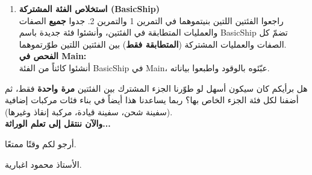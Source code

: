 \documentclass[14pt]{extarticle}
\begin{document}
\begin{enumerate}[label=\textbf{تمرين \arabic*:}, wide=0pt, leftmargin=*, itemsep=2.2em]
    \vspace{2em}
    \noindent \textbf{الفحص في \textenglish{Main}:} \\
    أنشئوا مركبة سبات، عبّئوها بالوقود، وجرّبوا سحب الوقود مرة بتاريخ يسبق تاريخ الوصول ومرة بتاريخ يساويه أو يتأخر عنه، واطبعوا النتائج.

    \item \textbf{استخلاص الفئة المشتركة (\textenglish{BasicShip})} \\
    راجعوا الفئتين اللتين بنيتموهما في التمرين 1 والتمرين 2. جدوا \textbf{جميع} الصفات والعمليات المتطابقة في الفئتين، وأنشئوا فئة جديدة باسم \textenglish{BasicShip} تضمّ كل الصفات والعمليات المشتركة (\textbf{المتطابقة فقط}) بين الفئتين اللتين طوّرتموهما. \\
    \textbf{الفحص في \textenglish{Main}:} \\
    أنشئوا كائناً من الفئة \textenglish{BasicShip} في \textenglish{Main}، عبّئوه بالوقود واطبعوا بياناته.

\end{enumerate}

\begin{boxAttention}
هل برأيكم كان سيكون أسهل لو طوّرنا الجزء المشترك بين الفئتين \textbf{مرة واحدة} فقط، ثم أضفنا لكل فئة الجزء الخاص بها؟ ربما يساعدنا هذا أيضاً في بناء فئات مركبات إضافية (سفينة شحن، سفينة قيادة، مركبة إنقاذ وغيرها). \\
\textbf{والآن ننتقل إلى تعلم الوراثة...}
\end{boxAttention}

\vspace{1cm}
\begin{flushleft}
أرجو لكم وقتًا ممتعًا.

الأستاذ محمود اغبارية.
\end{flushleft}
\end{document}
